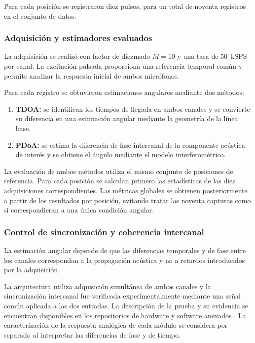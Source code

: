 Para cada posición se registraron diez pulsos, para
un total de noventa registros en el conjunto de datos.

\subsubsection{Adquisición y estimadores evaluados}

La adquisición se realizó con factor de diezmado
$M=10$ y una tasa de \SI{50}{kSPS} por canal. La excitación pulsada
proporciona una referencia temporal común y permite
analizar la respuesta inicial de ambos micrófonos.

Para cada registro se obtuvieron estimaciones
angulares mediante dos métodos:

\begin{enumerate}
    \item \textbf{TDOA:} se identifican los tiempos
    de llegada en ambos canales y se convierte su
    diferencia en una estimación angular mediante
    la geometría de la línea base.

    \item \textbf{PDoA:} se estima la diferencia de
    fase intercanal de la componente acústica de
    interés y se obtiene el ángulo mediante el
    modelo interferométrico.
\end{enumerate}

La evaluación de ambos métodos utiliza el mismo
conjunto de posiciones de referencia. Para cada
posición se calculan primero las estadísticas de
las diez adquisiciones correspondientes. Las métricas
globales se obtienen posteriormente a partir de los
resultados por posición, evitando tratar las noventa
capturas como si correspondieran a una única
condición angular.


\subsubsection{Control de sincronización y coherencia intercanal}

La estimación angular depende de que las diferencias
temporales y de fase entre los canales correspondan
a la propagación acústica y no a retardos introducidos
por la adquisición.

La arquitectura utiliza adquisición simultánea de ambos
canales y la sincronización intercanal fue verificada
experimentalmente mediante una señal común aplicada a
las dos entradas. La descripción de la prueba y su
evidencia se encuentran disponibles en los repositorios
de hardware y software anexados
\cite{SiririHW2026,SiririSW2026}. La caracterización
de la respuesta analógica de cada módulo se considera
por separado al interpretar las diferencias de fase y
de tiempo.

